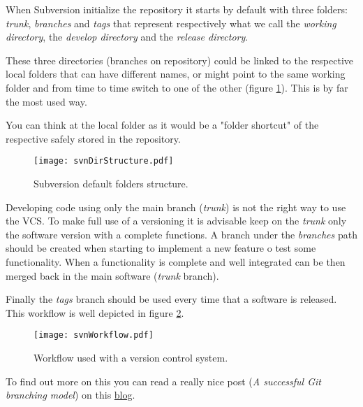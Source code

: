 When Subversion initialize the repository it starts by default with three folders: \textit{trunk}, \textit{branches} and \textit{tags} that represent respectively what we call the \textit{working directory}, the \textit{develop directory} and the \textit{release directory}.

These three directories (branches on repository) could be linked to the respective local folders that can have different names, or might point to the same working folder and from time to time switch to one of the other (figure \ref{fig:svnDirStructure}). This is by far the most used way.

You can think at the local folder as it would be a "folder shortcut" of the respective safely stored in the repository.

\begin{figure}[htbp]
    \centering
    \texttt{[image: svnDirStructure.pdf]}
    \caption{Subversion default folders structure.}
    \label{fig:svnDirStructure}
\end{figure}

Developing code using only the main branch (\textit{trunk}) is not the right way to use the VCS. To make full use of a versioning it is advisable keep on the \textit{trunk} only the software version with a complete functions. A branch under the \textit{branches} path should be created when starting to implement a new feature o test some functionality. When a functionality is complete and well integrated can be then merged back in the main software (\textit{trunk} branch).

Finally the \textit{tags} branch should be used every time that a software is released. This workflow is well depicted in figure \ref{fig:svnWorkflow}.

\begin{figure}[htbp]
    \centering
    \texttt{[image: svnWorkflow.pdf]}
    \caption{Workflow used with a version control system.}
    \label{fig:svnWorkflow}
\end{figure}

To find out more on this you can read a really nice post (\textit{A successful Git branching model}) on this \href{http://nvie.com/posts/a-successful-git-branching-model/}{blog}.









